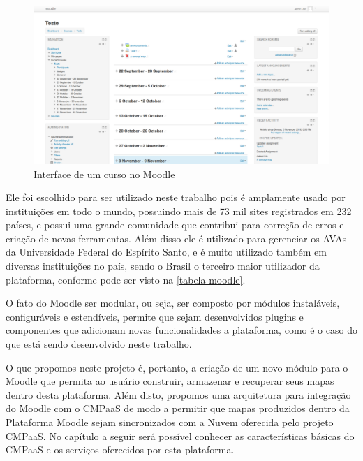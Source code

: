 \documentclass[
	12pt,				%
	openright,			%
	oneside,			%
	a4paper,			%
	english,			%
	french,				%
	spanish,			%
	brazil				%
	]{abntex2}
\begin{document}
\begin{figure}[htb]
	\caption{\label{fig_moodle}Interface de um curso no Moodle}
	\begin{center}
		\includegraphics[scale=0.2]{moodle.png}
	\end{center}
\end{figure}


Ele foi escolhido para ser utilizado neste trabalho pois é amplamente usado por instituições em todo o mundo, possuindo mais de 73 mil sites registrados em 232 países\cite{MoodleStat2016}, e possui uma grande comunidade que contribui para correção de erros e criação de novas ferramentas. Além disso ele é utilizado para gerenciar os AVAs da Universidade Federal do Espírito Santo, e é muito utilizado também em diversas instituições no país, sendo o Brasil o terceiro maior utilizador da plataforma, conforme pode ser visto na \autoref{tabela-moodle}.



O fato do Moodle ser modular, ou seja, ser composto por módulos instaláveis, configuráveis e estendíveis,  permite que sejam desenvolvidos plugins e componentes que adicionam novas funcionalidades a plataforma, como é o caso do que está sendo desenvolvido neste trabalho.

O que propomos neste projeto é, portanto, a criação de um novo módulo para o Moodle que permita ao usuário construir, armazenar e recuperar seus mapas dentro desta plataforma. Além disto, propomos uma arquitetura para integração do Moodle com o CMPaaS de modo a permitir que mapas produzidos dentro da Plataforma Moodle sejam sincronizados com a Nuvem oferecida pelo projeto CMPaaS. No capítulo a seguir será possível conhecer as características básicas do CMPaaS e os serviços oferecidos por esta plataforma.
\end{document}
